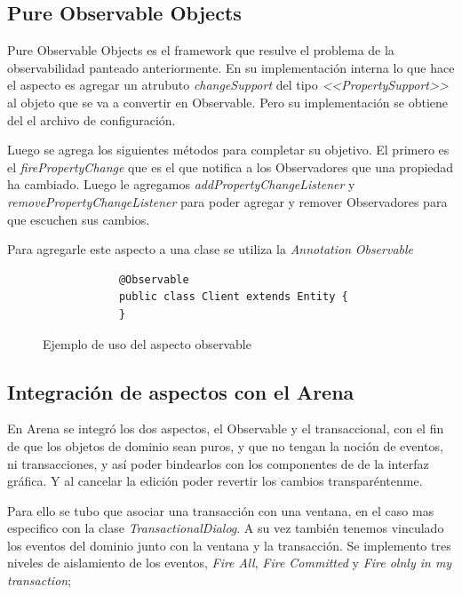 	\subsection{ Pure Observable Objects}
			
		Pure Observable Objects es el framework que resulve el problema de la
		observabilidad panteado anteriormente. En su implementación interna lo que
		hace el aspecto es agregar un atrubuto \emph{changeSupport} del tipo
		\emph{<<PropertySupport>>} al objeto que se va a convertir en Observable. Pero
		su implementación se obtiene del el archivo de configuración.
		
		Luego se agrega los siguientes métodos para completar su objetivo.
		El primero es el \emph{firePropertyChange} que es el que notifica a los
		Observadores que una propiedad ha cambiado.	Luego le agregamos
		\emph{addPropertyChangeListener} y \emph{removePropertyChangeListener} para
		poder agregar y remover Observadores para que escuchen sus cambios.
		
		Para agregarle este aspecto a una clase se utiliza la \emph{Annotation}
		\emph{Observable}
		
	\begin{figure}[h]
		\begin{lstlisting} 
			@Observable
			public class Client extends Entity {
			}
		\end{lstlisting}
		\caption{Ejemplo de uso del aspecto observable}
		\label{poo}
	\end{figure}  
		


	
\subsection{Integración de aspectos con el Arena}
	En Arena se integró los dos aspectos, el Observable y el transaccional, con el
	fin de que los objetos de dominio sean puros, y que no tengan la noción de
	eventos, ni transacciones, y así poder bindearlos con los componentes de de la
	interfaz gráfica. Y al cancelar la edición poder revertir los cambios
	transparéntenme.
	
	Para ello se tubo que asociar una transacción con una ventana, en el caso mas
	especifico con la clase \emph{TransactionalDialog}. A su vez también tenemos
	vinculado los eventos del dominio junto con la ventana y la transacción.
	Se implemento tres niveles de aislamiento de los eventos,  \emph{Fire All},
	\emph{Fire Committed} y \emph{Fire olnly in my transaction};
	

